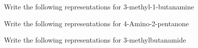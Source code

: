 \documentclass[10pt]{exam}
\begin{document}
\begin{questions}



\question Write the following representations for 3-methyl-1-butanamine

\question Write the following representations for 4-Amino-2-pentanone

\question Write the following representations for 3-methylbutanamide

\end{questions}
\end{document}
